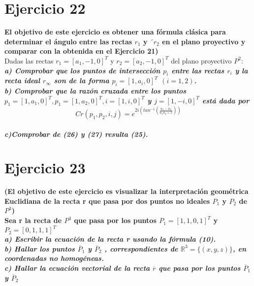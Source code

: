 \documentclass[12pt]{article}
\begin{document}
\section{Ejercicio 22 }

\textbf{El objetivo de este ejercicio es obtener una fórmula clásica para
determinar el ángulo entre las rectas $r_{1}$ y $´r_{2}$ en el plano proyectivo y comparar
con la obtenida en el Ejercicio 21)}
\\

Dadas las rectas  $r_{1}=[a_{1}, -1, 0]^{T}$ y $r_{2}=[a_{2}, -1, 0]^{T}$ del plano proyectivo $P^{2}$:
\\

\textit{\textbf{
a) Comprobar que los puntos de intersección $p_{i}$ entre las rectas $r_{i}$ y la
recta ideal $r_{\infty}$ son de la forma $p_{i}=[1, a_{i},0]^{T}$ $(i=1,2)$.
}}
\\



\textit{\textbf{b) Comprobar que la razón cruzada entre los puntos $p_{1}=[1,a_{1},0]^{T}, p_{1}=[1,a_{2},0]^{T}, i=[1,i,0]^{T}$ y $j=[1,-i,0]^{T}$
está dada por $$Cr(p_{1},p_{2},i,j) =e^{2i\left(tan^{-1}\left(\frac{a_{1}-a_{2}}{a_{1}a_{2} + 1}\right)\right)}$$
}}
\\


\textit{\textbf{c)Comprobar de (26) y (27) resulta (25).}}
\\


\section{Ejercicio 23}
\textbf{(El objetivo de este ejercicio es visualizar la interpretación geométrica Euclidiana de la recta r que pasa por dos puntos no ideales $P_{1}$ y $P_{2}$ de $P^{3}$)\\
Sea r la recta de $P^{3}$ que pasa por los puntos $P_{1} = [1, 1, 0,1]^{T}$ y  $P_{2} = [0, 1, 1 ,1]^{T}$}
\\

\textit{\textbf{
a) Escribir la ecuación de la recta r usando la fórmula (10).}}
\\



\textit{\textbf{
b) Hallar los puntos $\overline{P}_{1}$ y $\overline{P}_{2}$ , correspondientes de $\mathbb{R}^{3}= \{(x,y,z)\}$, en coordenadas no homogéneas.}}
\\



\textit{\textbf{
c) Hallar la ecuación vectorial de la recta $\overline{r}$ que pasa por los puntos $\overline{P}_{1}$ y $\overline{P}_{2}$}}
\\
\end{document}
